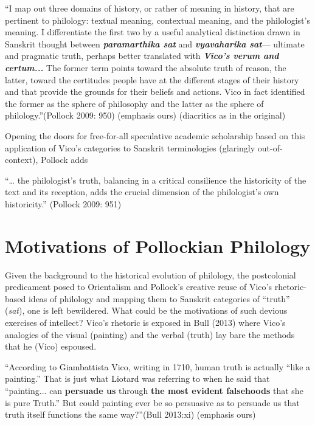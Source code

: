 \begin{myquote}
“I map out three domains of history, or rather of meaning in history, that are pertinent to philology: textual meaning, contextual meaning, and the philologist’s meaning. I differentiate the first two by a useful analytical distinction drawn in Sanskrit thought between \textbf{\textit{paramarthika sat}} and \textbf{\textit{vyavaharika sat}}— ultimate and pragmatic truth, perhaps better translated with \textbf{\textit{Vico’s verum and certum...}} The former term points toward the absolute truth of reason, the latter, toward the certitudes people have at the different stages of their history and that provide the grounds for their beliefs and actions. Vico in fact identified the former as the sphere of philosophy and the latter as the sphere of philology.”\hfill (Pollock 2009: 950) (emphasis ours) (diacritics as in the original)
\end{myquote}

Opening the doors for free-for-all speculative academic scholarship based on this application of Vico’s categories to Sanskrit terminologies (glaringly out-of-context), Pollock adds

\begin{myquote}
“… the philologist’s truth, balancing in a critical consilience the historicity of the text and its reception, adds the crucial dimension of the philologist’s own historicity.” (Pollock 2009: 951)
\end{myquote}


\section*{Motivations of Pollockian Philology}

Given the background to the historical evolution of philology, the postcolonial predicament posed to Orientalism and Pollock’s creative reuse of Vico’s rhetoric-based ideas of philology and mapping them to Sanskrit categories of “truth” (\textit{sat}), one is left bewildered. What could be the motivations of such devious exercises of intellect? Vico’s rhetoric is exposed in Bull (2013) where Vico’s analogies of the visual (painting) and the verbal (truth) lay bare the methods that he (Vico) espoused.

\begin{myquote}
“According to Giambattista Vico, writing in 1710, human truth is actually “like a painting.” That is just what Liotard was referring to when he said that “painting... can \textbf{persuade us} through \textbf{the most evident falsehoods} that she is pure Truth.” But could painting ever be so persuasive as to persuade us that truth itself functions the same way?”\hfill (Bull 2013:xi) (emphasis ours)
\end{myquote}

